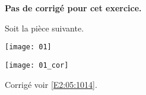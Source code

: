 \normaltrue \difficilefalse \tdifficilefalse
\correctionfalse


\setcounter{question}{0}

\ifcorrection
\else
\textbf{Pas de corrigé pour cet exercice.}
\fi


\ifprof 
\else
Soit la pièce suivante.
\begin{center}
\texttt{[image: 01]}
\end{center}
 \fi
 
\ifprof
\begin{center}
\texttt{[image: 01\_cor]}
\end{center}
\else 

\fi

\ifprof
\else
\begin{flushright}
\footnotesize{Corrigé  voir \ref{E2:05:1014}.}
\end{flushright}%
\fi